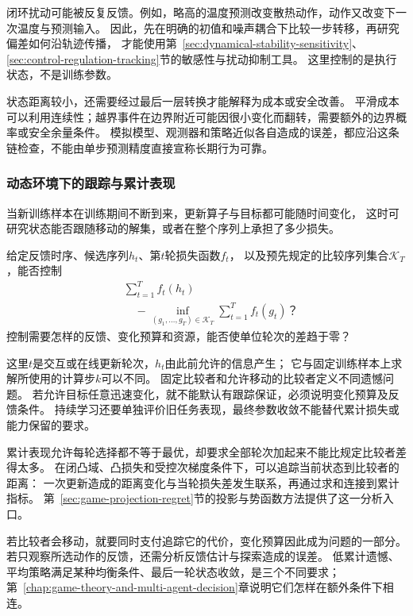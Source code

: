 闭环扰动可能被反复反馈。例如，略高的温度预测改变散热动作，动作又改变下一次温度与预测输入。
因此，先在明确的初值和噪声耦合下比较一步转移，再研究偏差如何沿轨迹传播，
才能使用第~\ref{sec:dynamical-stability-sensitivity}、\ref{sec:control-regulation-tracking}节的敏感性与扰动抑制工具。
这里控制的是执行状态，不是训练参数。

状态距离较小，还需要经过最后一层转换才能解释为成本或安全改善。
平滑成本可以利用连续性；越界事件在边界附近可能因很小变化而翻转，需要额外的边界概率或安全余量条件。
模拟模型、观测器和策略近似各自造成的误差，都应沿这条链检查，不能由单步预测精度直接宣称长期行为可靠。

\subsubsection{动态环境下的跟踪与累计表现}
\label{sec:future-analysis-cumulative-comparison}

当新训练样本在训练期间不断到来，更新算子与目标都可能随时间变化，
这时可研究状态能否跟随移动的解集，或者在整个序列上承担了多少损失。

\begin{mathproblem}[序列相对于比较者的累计表现]
  \label{question:future-cumulative-comparison}
  给定反馈时序、候选序列$h_t$、第$t$轮损失函数$f_t$，
  以及预先规定的比较序列集合$\mathcal K_T$，能否控制
  \[
    \begin{aligned}
      &\sum_{t=1}^Tf_t(h_t)\\
      &\quad-\inf_{(g_1,\ldots,g_T)\in\mathcal K_T}
         \sum_{t=1}^Tf_t(g_t)\text{？}
    \end{aligned}
  \]
  控制需要怎样的反馈、变化预算和资源，能否使单位轮次的差趋于零？
\end{mathproblem}

这里$t$是交互或在线更新轮次，$h_t$由此前允许的信息产生；
它与固定训练样本上求解所使用的计算步$k$可以不同。
固定比较者和允许移动的比较者定义不同遗憾问题。
若允许目标任意迅速变化，就不能默认有跟踪保证，必须说明变化预算及反馈条件。
持续学习还要单独评价旧任务表现，最终参数收敛不能替代累计损失或能力保留的要求。

累计表现允许每轮选择都不等于最优，却要求全部轮次加起来不能比规定比较者差得太多。
在闭凸域、凸损失和受控次梯度条件下，可以追踪当前状态到比较者的距离：
一次更新造成的距离变化与当轮损失差发生联系，再通过求和连接到累计指标。
第~\ref{sec:game-projection-regret}节的投影与势函数方法提供了这一分析入口。

若比较者会移动，就要同时支付追踪它的代价，变化预算因此成为问题的一部分。
若只观察所选动作的反馈，还需分析反馈估计与探索造成的误差。
低累计遗憾、平均策略满足某种均衡条件、最后一轮状态收敛，是三个不同要求；
第~\ref{chap:game-theory-and-multi-agent-decision}章说明它们怎样在额外条件下相连。

